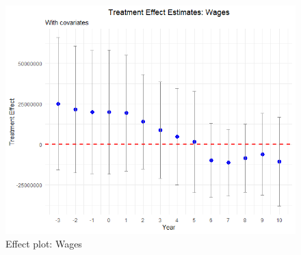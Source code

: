 \begin{figure}[htbp]
    \centering
    \includegraphics[width=\textwidth,keepaspectratio]{images/tes_wages.png}
    \caption{Effect plot: Wages}
    \label{fig:tes_wages}
\end{figure}


